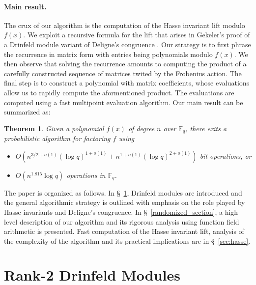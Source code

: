 \documentclass[12pt]{article}
\theoremstyle{plain}
\newtheorem{theorem}{Theorem}
\theoremstyle{definition}
\def\F{\ensuremath{\mathbb{F}}}
\begin{document}
\paragraph{Main result.}
The crux of our algorithm is the computation of the Hasse invariant lift modulo $f(x)$. We exploit 
a recursive formula for the lift that arises in Gekeler's proof of a Drinfeld module variant of 
Deligne's congruence \cite{gek}. Our strategy is to first phrase the recurrence in matrix form with 
entries being polynomials modulo $f(x)$. We then observe that solving the recurrence amounts to 
computing the product of a carefully constructed sequence of matrices twited by the Frobenius 
action. The final step is to construct a polynomial with matrix coefficients, whose evaluations 
allow us to rapidly compute the aformentioned product. The evaluations are computed using a fast 
multipoint evaluation algorithm. Our main result can be summarized as:

\begin{theorem}
	\label{theorem:main}
	Given a polynomial $f(x)$ of degree $n$ over $\F_q$, there exits a probabilistic algorithm for 
	factoring $f$ using
	\begin{itemize}
		\item $O(n^{3/2+o(1)} (\log q)^{1+o(1)} + n^{1+o(1)} (\log q)^{2+o(1)})$ bit operations, or
		\item $O(n^{1.815}\log q)$ operations in $\F_q$.
	\end{itemize}
\end{theorem}


The paper is organized as follows. In \S~\ref{drinfeld_section}, Drinfeld modules are introduced 
and the general algorithmic strategy is outlined with emphasis on the role played by Hasse 
invariants and Deligne's congruence. In \S~\ref{randomized_section}, a high level description of 
our algorithm and its rigorous analysis using function field arithmetic is presented. Fast 
computation of the Hasse invariant lift, analysis of the complexity of the algorithm and its 
practical implications are in \S~\ref{sec:hasse}. 
 
 

\section{Rank-2 Drinfeld Modules}\label{drinfeld_section}


\end{document}
